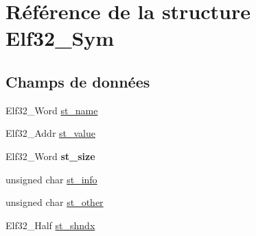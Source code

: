 \hypertarget{structElf32__Sym}{\section{Référence de la structure Elf32\-\_\-\-Sym}
\label{structElf32__Sym}
}
\subsection*{Champs de données}
\begin{DoxyCompactItemize}
\item 
Elf32\-\_\-\-Word \hyperlink{structElf32__Sym_a6a972b30868879f8a1e071e0c45e5031}{st\-\_\-name}
\item 
Elf32\-\_\-\-Addr \hyperlink{structElf32__Sym_abf8ff76884bc5e2acb5f7eb42f733c2e}{st\-\_\-value}
\item 
\hypertarget{structElf32__Sym_a1b410e69fecd2610bc7e58d2b0245053}{Elf32\-\_\-\-Word {\bfseries st\-\_\-size}}\label{structElf32__Sym_a1b410e69fecd2610bc7e58d2b0245053}

\item 
unsigned char \hyperlink{structElf32__Sym_a7d131c44ec48708b1c98f9b00ca9d528}{st\-\_\-info}
\item 
unsigned char \hyperlink{structElf32__Sym_a2e1bf6bedb5180f74ea8cbaf9cedfd36}{st\-\_\-other}
\item 
Elf32\-\_\-\-Half \hyperlink{structElf32__Sym_a46e54847ab00fbea62df8ee5dff8dec6}{st\-\_\-shndx}
\end{DoxyCompactItemize}



